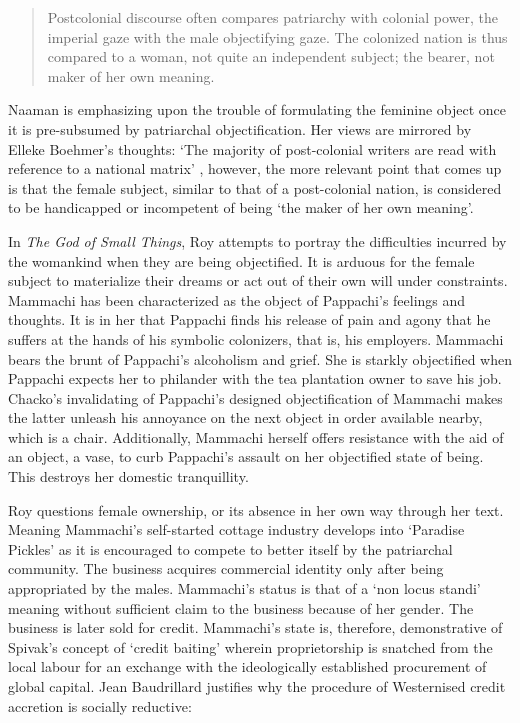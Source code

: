\begin{quote}
  Postcolonial discourse often compares patriarchy with colonial power, the imperial gaze with the male objectifying gaze. The colonized nation is thus compared to a woman, not quite an independent subject; the bearer, not maker of her own meaning. \parencite[333-342]{Naaman2000}
\end{quote}

Naaman is emphasizing upon the trouble of formulating the feminine object once it is pre-subsumed by patriarchal objectification. Her views are mirrored by Elleke Boehmer's thoughts: `The majority of post-colonial writers are read with reference to a national matrix' \parencite[170-81]{Elleke2010}, however, the more relevant point that comes up is that the female subject, similar to that of a post-colonial nation, is considered to be handicapped or incompetent of being `the maker of her own meaning'.

In \emph{The God of Small Things}, Roy attempts to portray the difficulties incurred by the womankind when they are being objectified. It is arduous for the female subject to materialize their dreams or act out of their own will under constraints. Mammachi has been characterized as the object of Pappachi's feelings and thoughts. It is in her that Pappachi finds his release of pain and agony that he suffers at the hands of his symbolic colonizers, that is, his employers. Mammachi bears the brunt of Pappachi's alcoholism and grief. She is starkly objectified when Pappachi expects her to philander with the tea plantation owner to save his job. Chacko's invalidating of Pappachi's designed objectification of Mammachi makes the latter unleash his annoyance on the next object in order available nearby, which is a chair. Additionally, Mammachi herself offers resistance with the aid of an object, a vase, to curb Pappachi's assault on her objectified state of being. This destroys her domestic tranquillity. 

Roy questions female ownership, or its absence in her own way through her text. Meaning Mammachi's self-started cottage industry develops into `Paradise Pickles' as it is encouraged to compete to better itself by the patriarchal community. The business acquires commercial identity only after being appropriated by the males. Mammachi's status is that of a `non locus standi' meaning without sufficient claim to the business because of her gender. The business is later sold for credit. Mammachi's state is, therefore, demonstrative of Spivak's concept of `credit baiting' wherein proprietorship is snatched from the local labour for an exchange with the ideologically established procurement of global capital. Jean Baudrillard justifies why the procedure of Westernised credit accretion is socially reductive:

